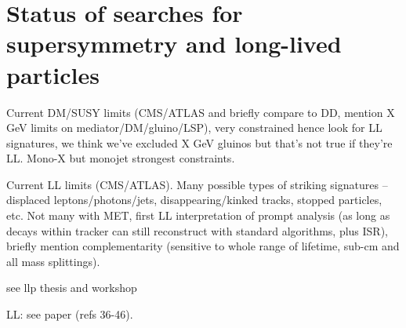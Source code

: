 


\begin{comment}
Define compressed and uncompressed? Mention ISR/FSR? (Adam)
\end{comment}


\section{Status of searches for supersymmetry and long-lived particles}

Current DM/SUSY limits (CMS/ATLAS and briefly compare to DD, mention X GeV 
limits on 
mediator/DM/gluino/LSP), very constrained hence look for LL signatures, we 
think we’ve excluded X GeV gluinos but that’s not true if they’re LL.
Mono-X but monojet strongest constraints.

Current LL limits (CMS/ATLAS).
Many possible types of striking signatures -- displaced leptons/photons/jets, 
disappearing/kinked tracks, stopped particles, etc.
Not many with MET, first LL interpretation of 
prompt analysis (as long as decays within tracker can still reconstruct with 
standard algorithms, plus ISR), briefly mention complementarity (sensitive to 
whole range of lifetime, sub-cm and all mass splittings).

see llp thesis and workshop

LL: see paper (refs 36-46).

